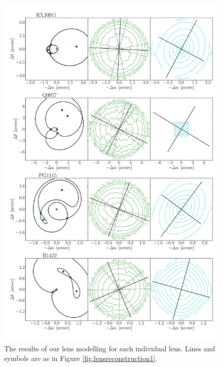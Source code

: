 \documentclass[useAMS,usenatbib]{mn2e}
\begin{document}
\begin{figure}
  \centering
  \includegraphics[width=.8\linewidth]{Figures/AllLenses32.pdf}
  \caption[width=.65\linewidth]{The results of our lens modelling for each individual lens. Lines and symbols are as in Figure \ref{fig:lensreconstruction1}.}
  \label{fig:lensreconstruction2}
\end{figure}
\end{document}
